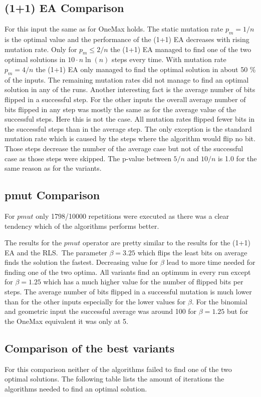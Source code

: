 \subsection{(1+1) EA Comparison}

For this input the same as for OneMax holds. 
The static mutation rate $p_m=1/n$ is the optimal value and the performance of the (1+1) EA decreases with rising mutation rate.
Only for $p_m\le2/n$ the (1+1) EA managed to find one of the two optimal solutions in $10 \cdot n\ln(n)$ steps every time.
With mutation rate $p_m=4/n$ the (1+1) EA only managed to find the optimal solution in about 50 \% of the inputs.
The remaining mutation rates did not manage to find an optimal solution in any of the runs.
Another interesting fact is the average number of bits flipped in a successful step.
For the other inputs the overall average number of bits flipped in any step was mostly the same as for the average value of the successful steps. Here this is not the case.
All mutation rates flipped fewer bits in the successful steps than in the average step.
The only exception is the standard mutation rate which is caused by the steps where the algorithm would flip no bit.
Those steps decrease the number of the average case but not of the successful case as those steps were skipped.
The p-value between $5/n$ and $10/n$ is 1.0 for the same reason as for the \RLSN[b] variants.
\subsection{pmut Comparison}
For $pmut$ only 1798/10000 repetitions were executed as there was a clear tendency which of the algorithms performs better.


The results for the $pmut$ operator are pretty similar to the results for the (1+1) EA and the RLS.\
The parameter $\beta=3.25$ which flips the least bits on average finds the solution the fastest.
Decreasing value for $\beta$ lead to more time needed for finding one of the two optima.
All variants find an optimum in every run except for $\beta=1.25$ which has a much higher value for the number of flipped bits per steps.
The average number of bits flipped in a successful mutation is much lower than for the other inputs especially for the lower values for $\beta$.
For the binomial and geometric input the successful average was around 100 for $\beta=1.25$ but for the OneMax equivalent it was only at 5.

\subsection{Comparison of the best variants}
For this comparison neither of the algorithms failed to find one of the two optimal solutions.
The following table lists the amount of iterations the algorithms needed to find an optimal solution.

